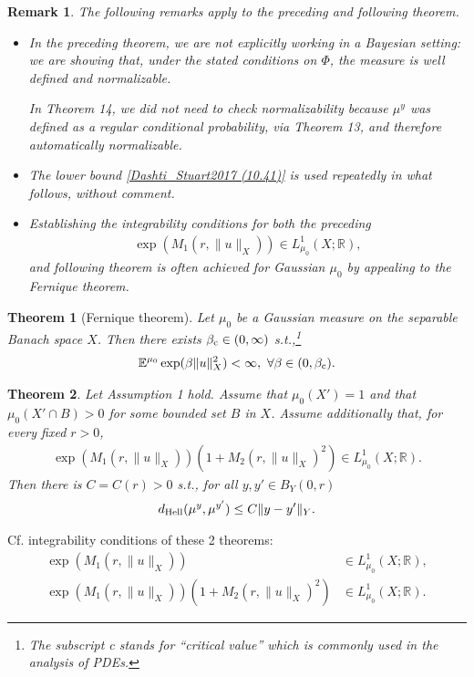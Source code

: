 \documentclass[oneside,11pt]{book}
\numberwithin{equation}{section}
\newtheorem{theorem}{Theorem}[section]
\newtheorem{remark}{Remark}[section]
\begin{document}
\begin{remark}
    The following remarks apply to the preceding and following theorem.
    \begin{itemize}
        \item In the preceding theorem, we are not explicitly working in a Bayesian setting: we are showing that, under the stated conditions on $\Phi$, the measure is well defined and normalizable.
        
        In Theorem 14, we did not need to check normalizability because $\mu^y$ was defined as a regular conditional probability, via Theorem 13, and therefore automatically normalizable.
        \item The lower bound \eqref{Dashti_Stuart2017 (10.41)} is used repeatedly in what follows, without comment.
        \item Establishing the integrability conditions for both the preceding
        \begin{align*}
            \exp(M_1(r,\|u\|_X))\in L_{\mu_0}^1(X;\mathbb{R}),
        \end{align*}
        and following theorem is often achieved for Gaussian $\mu_0$ by appealing to the Fernique theorem.
    \end{itemize}
\end{remark}

\begin{theorem}[Fernique theorem]
    Let $\mu_0$ be a Gaussian measure on the separable Banach space $X$. Then there exists $\beta_{\rm c}\in(0,\infty)$ s.t.,\footnote{The subscript c stands for ``critical value'' which is commonly used in the analysis of PDEs.}
    \begin{align*}
        \mathbb{E}^{\mu_0}\exp(\beta\|u\|_X^2) < \infty,\ \forall\beta\in(0,\beta_{\rm c}).
    \end{align*}
\end{theorem}

\begin{theorem}
    Let Assumption 1 hold. Assume that $\mu_0(X') = 1$ and that $\mu_0(X'\cap B) > 0$ for some bounded set $B$ in $X$. Assume additionally that, for every fixed $r > 0$,
    \begin{align*}
        \exp(M_1(r,\|u\|_X))\left(1 + M_2(r,\|u\|_X)^2\right)\in L_{\mu_0}^1(X;\mathbb{R}).
    \end{align*}
    Then there is $C = C(r) > 0$ s.t., for all $y,y'\in B_Y(0,r)$
    \begin{align*}
        d_{\rm Hell}(\mu^y,\mu^{y'})\le C\|y - y'\|_Y.
    \end{align*}
\end{theorem}
Cf. integrability conditions of these 2 theorems:
\begin{align*}
    \exp(M_1(r,\|u\|_X))&\in L_{\mu_0}^1(X;\mathbb{R}),\\
    \exp(M_1(r,\|u\|_X))\left(1 + M_2(r,\|u\|_X)^2\right)&\in L_{\mu_0}^1(X;\mathbb{R}).
\end{align*}
\end{document}

